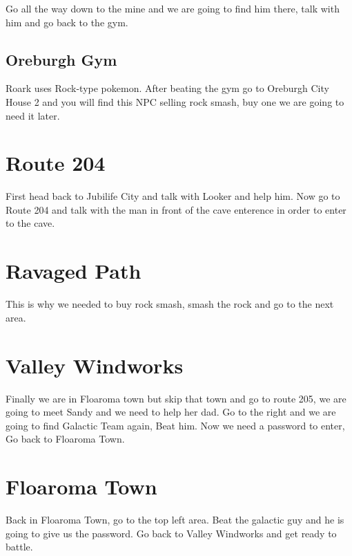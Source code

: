 \documentclass[11pt]{article}
\begin{document}
Go all the way down to the mine and we are going to find him there,
talk with him and go back to the gym.




\subsection{Oreburgh Gym}\label{subsec:oreburgh-gym}
Roark uses Rock-type pokemon.
After beating the gym go to Oreburgh City House 2 and you will find this NPC
selling rock smash, buy one we are going to need it later.

\section{Route 204}\label{sec:Route_204}
First head back to Jubilife City and talk with Looker and help him.
Now go to Route 204 and talk with the man in front of the cave enterence
in order to enter to the cave.




\section{Ravaged Path}\label{sec:Ravaged_Path}
This is why we needed to buy rock smash, smash the rock and go to the next area.




\section{Valley Windworks}\label{sec:valley-windworks}
Finally we are in Floaroma town but skip that town and go to route 205,
we are going to meet Sandy and we need to help her dad.
Go to the right and we are going to find Galactic Team again, Beat him.
Now we need a password to enter, Go back to Floaroma Town.




\section{Floaroma Town}\label{sec:floaroma-town}
Back in Floaroma Town, go to the top left area.
Beat the galactic guy and he is going to give us the password.
Go back to Valley Windworks and get ready to battle.
\end{document}
